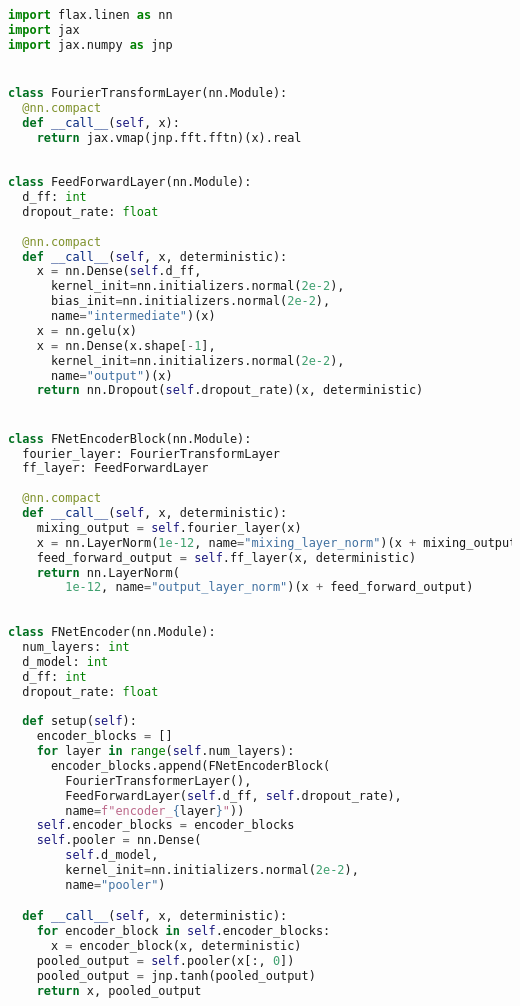 \documentclass[11pt]{article}
\begin{document}
\begin{lstlisting}[language=python, caption=FNet code written in JAX/Flax. Embedding and output projection layers are omitted for simplicity., captionpos=b, float=*t]
import flax.linen as nn
import jax
import jax.numpy as jnp


class FourierTransformLayer(nn.Module):
  @nn.compact
  def __call__(self, x):
    return jax.vmap(jnp.fft.fftn)(x).real
    
    
class FeedForwardLayer(nn.Module):
  d_ff: int
  dropout_rate: float
  
  @nn.compact
  def __call__(self, x, deterministic):
    x = nn.Dense(self.d_ff, 
      kernel_init=nn.initializers.normal(2e-2), 
      bias_init=nn.initializers.normal(2e-2), 
      name="intermediate")(x)
    x = nn.gelu(x)
    x = nn.Dense(x.shape[-1], 
      kernel_init=nn.initializers.normal(2e-2), 
      name="output")(x)
    return nn.Dropout(self.dropout_rate)(x, deterministic)


class FNetEncoderBlock(nn.Module):
  fourier_layer: FourierTransformLayer
  ff_layer: FeedForwardLayer
  
  @nn.compact
  def __call__(self, x, deterministic):
    mixing_output = self.fourier_layer(x)
    x = nn.LayerNorm(1e-12, name="mixing_layer_norm")(x + mixing_output)
    feed_forward_output = self.ff_layer(x, deterministic)
    return nn.LayerNorm(
        1e-12, name="output_layer_norm")(x + feed_forward_output)
        
        
class FNetEncoder(nn.Module):
  num_layers: int
  d_model: int
  d_ff: int
  dropout_rate: float
  
  def setup(self):
    encoder_blocks = []
    for layer in range(self.num_layers):
      encoder_blocks.append(FNetEncoderBlock(
        FourierTransformerLayer(), 
        FeedForwardLayer(self.d_ff, self.dropout_rate), 
        name=f"encoder_{layer}"))
    self.encoder_blocks = encoder_blocks
    self.pooler = nn.Dense(
        self.d_model, 
        kernel_init=nn.initializers.normal(2e-2), 
        name="pooler")

  def __call__(self, x, deterministic):
    for encoder_block in self.encoder_blocks:
      x = encoder_block(x, deterministic)
    pooled_output = self.pooler(x[:, 0])
    pooled_output = jnp.tanh(pooled_output)
    return x, pooled_output
\end{lstlisting}
 
\end{document}
